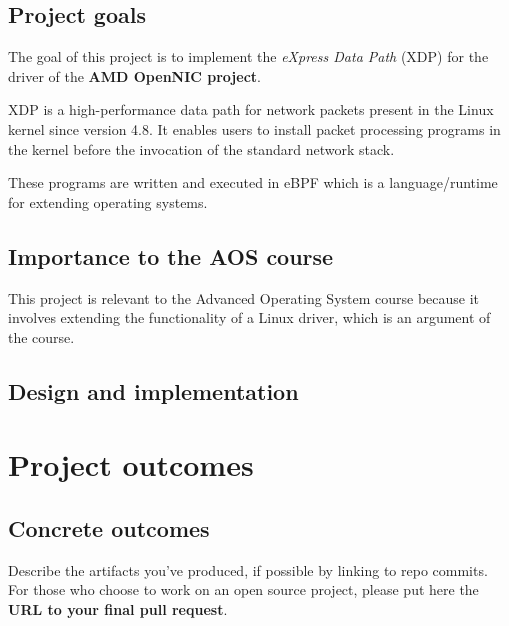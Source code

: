 \documentclass[10pt,a4]{article}
\begin{document}
\subsection{Project goals}
The goal of this project is to implement the \textit{eXpress Data Path} (XDP) for the driver of the \textbf{AMD OpenNIC project}.

XDP is a high-performance  data path for network packets present in the Linux kernel since version 4.8. It enables users to install packet processing programs in the kernel before the invocation of the standard network stack. 

These programs are written and executed in eBPF which is a language/runtime for extending operating systems.



\subsection{Importance to the AOS course}
This project is relevant to the Advanced Operating System course because it involves extending the functionality of a Linux driver, which is an argument of the course.



\subsection{Design and implementation}





\section{Project outcomes}

\subsection{Concrete outcomes}
Describe the artifacts you've produced, if possible by linking to repo commits.
For those who choose to work on an open source project, please put here the 
\textbf{URL to your final pull request}.
\end{document}

